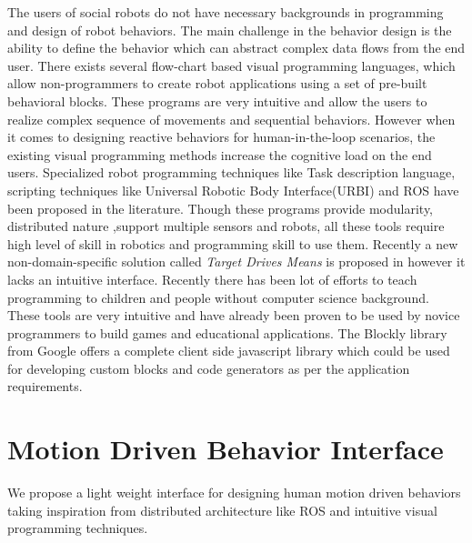 \documentclass{llncs}
\begin{document}
	The users of social robots do not have necessary backgrounds in programming and design of robot behaviors. The main challenge in the behavior design is the ability to define the behavior which can abstract complex data flows from the end user. There exists several flow-chart based visual programming languages\cite{MSRS4},\cite{Choregraphe} which allow non-programmers to create robot applications using a set of pre-built behavioral blocks. These programs are very intuitive and allow the users to realize complex sequence of movements and sequential behaviors. However when it comes to designing reactive behaviors for human-in-the-loop scenarios, the existing visual programming methods increase the cognitive load on the end users. Specialized robot programming techniques like Task description language\cite{Simmons724883}, scripting techniques like Universal Robotic Body Interface(URBI)\cite{Baillie4814281} and ROS\cite{quigley2009ros} have been proposed in the literature. Though these programs provide modularity, distributed nature ,support multiple sensors and robots, all these tools require high level of skill in robotics and programming skill to use them. Recently a new non-domain-specific solution called \emph{Target Drives Means} is proposed in \cite{BerenzTDM2014} however it lacks an intuitive interface.
	Recently there has been lot of efforts to teach programming to children and people without computer science background\cite{Scratch}\cite{TouchDevelop}\cite{Blockly}. These tools are very intuitive and have already been proven to be used by novice programmers to build games and educational applications. The Blockly library\cite{Blockly} from Google offers a complete client side javascript library which could be used for developing custom blocks and code generators as per the application requirements.
\section{Motion Driven Behavior Interface}
%
We propose a light weight interface for designing human motion driven behaviors taking inspiration from distributed architecture like ROS\cite{quigley2009ros} and intuitive visual programming techniques. 
%
\end{document}
